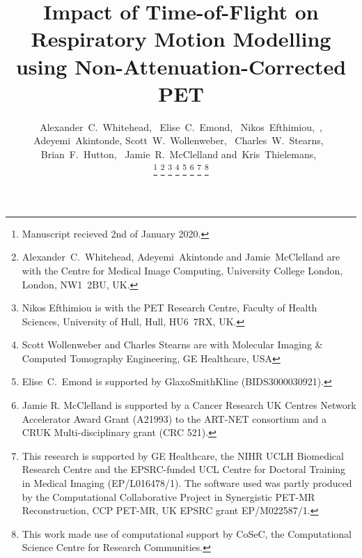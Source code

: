\documentclass[10pt,twocolumn,twoside,letterpaper]{IEEEtran}
\begin{document}
\title{Impact of Time-of-Flight on Respiratory Motion Modelling using Non-Attenuation-Corrected PET}

\pagestyle{plain}

\author{Alexander~C.~Whitehead,~
        Elise~C.~Emond,~
        Nikos~Efthimiou,~,
        Adeyemi~Akintonde,
        Scott~W.~Wollenweber,~
        Charles~W.~Stearns,~
        Brian~F.~Hutton,~
        Jamie~R.~McClelland
        and~Kris~Thielemans,~%

    \thanks{Manuscript recieved 2nd of January 2020.}%
    \thanks{Alexander~C.~Whitehead, Adeyemi~Akintonde and Jamie~McClelland are with the Centre for Medical Image Computing, University College London, London, NW1~2BU, UK.}%
    \thanks{Nikos Efthimiou is with the PET Research Centre, Faculty of Health Sciences, University of Hull, Hull, HU6~7RX, UK.}%
    \thanks{Scott Wollenweber and Charles Stearns are with Molecular Imaging \& Computed Tomography Engineering, GE Healthcare, USA}%
    \thanks{Elise~C.~Emond is supported by GlaxoSmithKline (BIDS3000030921).}%
    \thanks{Jamie R. McClelland is supported by a Cancer Research UK Centres Network Accelerator Award Grant (A21993) to the ART-NET consortium and a CRUK Multi-disciplinary grant (CRC 521).}%
    \thanks{This research is supported by GE Healthcare, the NIHR UCLH Biomedical Research Centre and the EPSRC-funded UCL Centre for Doctoral Training in Medical Imaging (EP/L016478/1).%
    The software used was partly produced by the Computational Collaborative Project in Synergistic PET-MR Reconstruction, CCP PET-MR, UK EPSRC grant EP/M022587/1.}%
    \thanks{This work made use of computational support by CoSeC, the Computational Science Centre for Research Communities.}%
}

\maketitle
\IEEEpeerreviewmaketitle
\end{document}
